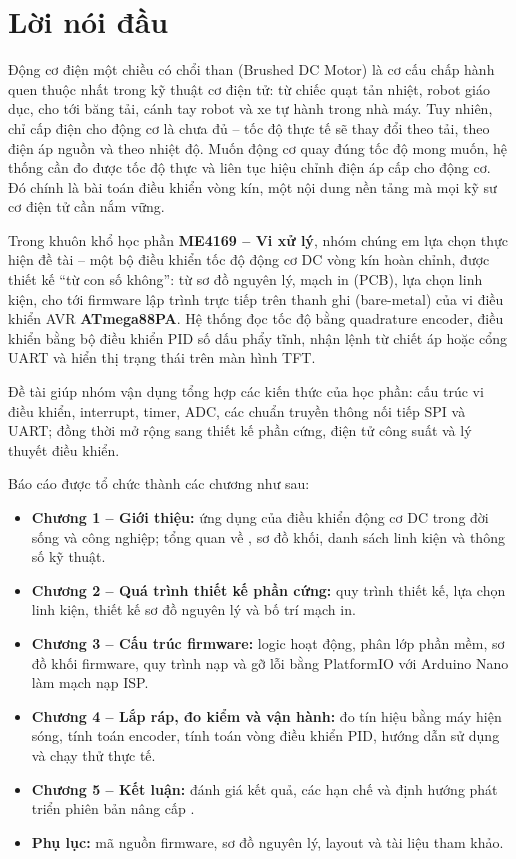 \chapter*{Lời nói đầu}

Động cơ điện một chiều có chổi than (Brushed DC Motor) là cơ cấu chấp hành quen thuộc nhất trong kỹ thuật cơ điện tử: từ chiếc quạt tản nhiệt, robot giáo dục, cho tới băng tải, cánh tay robot và xe tự hành trong nhà máy. Tuy nhiên, chỉ cấp điện cho động cơ là chưa đủ -- tốc độ thực tế sẽ thay đổi theo tải, theo điện áp nguồn và theo nhiệt độ. Muốn động cơ quay đúng tốc độ mong muốn, hệ thống cần đo được tốc độ thực và liên tục hiệu chỉnh điện áp cấp cho động cơ. Đó chính là bài toán điều khiển vòng kín, một nội dung nền tảng mà mọi kỹ sư cơ điện tử cần nắm vững.

Trong khuôn khổ học phần \textbf{ME4169 -- Vi xử lý}, nhóm chúng em lựa chọn thực hiện đề tài \textbf{\proj} -- một bộ điều khiển tốc độ động cơ DC vòng kín hoàn chỉnh, được thiết kế ``từ con số không'': từ sơ đồ nguyên lý, mạch in (PCB), lựa chọn linh kiện, cho tới firmware lập trình trực tiếp trên thanh ghi (bare-metal) của vi điều khiển AVR \textbf{ATmega88PA}. Hệ thống đọc tốc độ bằng quadrature encoder, điều khiển bằng bộ điều khiển PID số dấu phẩy tĩnh, nhận lệnh từ chiết áp hoặc cổng UART và hiển thị trạng thái trên màn hình TFT.

Đề tài giúp nhóm vận dụng tổng hợp các kiến thức của học phần: cấu trúc vi điều khiển, interrupt, timer, ADC, các chuẩn truyền thông nối tiếp SPI và UART; đồng thời mở rộng sang thiết kế phần cứng, điện tử công suất và lý thuyết điều khiển.

Báo cáo được tổ chức thành các chương như sau:
\begin{itemize}[leftmargin=1.5cm]
  \item \textbf{Chương 1 -- Giới thiệu:} ứng dụng của điều khiển động cơ DC trong đời sống và công nghiệp; tổng quan về \proj, sơ đồ khối, danh sách linh kiện và thông số kỹ thuật.
  \item \textbf{Chương 2 -- Quá trình thiết kế phần cứng:} quy trình thiết kế, lựa chọn linh kiện, thiết kế sơ đồ nguyên lý và bố trí mạch in.
  \item \textbf{Chương 3 -- Cấu trúc firmware:} logic hoạt động, phân lớp phần mềm, sơ đồ khối firmware, quy trình nạp và gỡ lỗi bằng PlatformIO với Arduino Nano làm mạch nạp ISP.
  \item \textbf{Chương 4 -- Lắp ráp, đo kiểm và vận hành:} đo tín hiệu bằng máy hiện sóng, tính toán encoder, tính toán vòng điều khiển PID, hướng dẫn sử dụng và chạy thử thực tế.
  \item \textbf{Chương 5 -- Kết luận:} đánh giá kết quả, các hạn chế và định hướng phát triển phiên bản nâng cấp \projpro.
  \item \textbf{Phụ lục:} mã nguồn firmware, sơ đồ nguyên lý, layout và tài liệu tham khảo.
\end{itemize}

